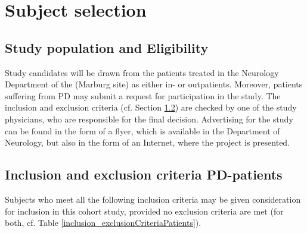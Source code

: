 \section{Subject selection}
\label{sec:study_selection}
\subsection{Study population and Eligibility}
\label{sec:study_population}
Study candidates will be drawn from the patients treated in the Neurology Department of the \UKGM (Marburg site) as either in- or outpatients. Moreover, patients suffering from \ac{PD} may submit a request for participation in the study. The inclusion and exclusion criteria (cf. Section \ref{sec:inclusion_criteriaIPS}) are checked by one of the study physicians, who are responsible for the final decision. Advertising for the study can be found in the form of a flyer, which is available in the Department of Neurology, but also in the form of an Internet, where the project is presented.

\subsection{Inclusion and exclusion criteria \ac{PD}-patients}
\label{sec:inclusion_criteriaIPS}
Subjects who meet all the following inclusion criteria may be given consideration for inclusion in this cohort study, provided no exclusion criteria are met (for both, cf. Table \ref{inclusion_exclusionCriteriaPatients}).


